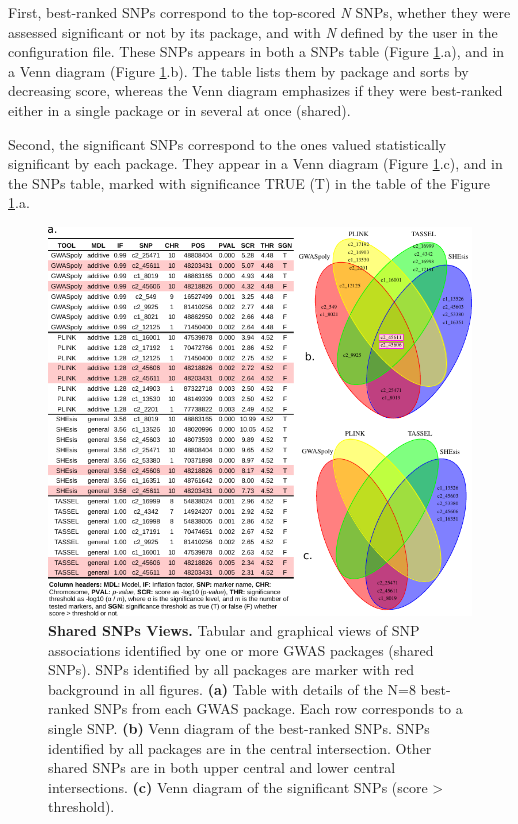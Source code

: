 \documentclass{article}
\begin{document}
First, best-ranked SNPs correspond to the top-scored \emph{N} SNPs, whether they were assessed significant or not by its package, and with\emph{ N} defined by the user in the configuration file. These SNPs appears in both a SNPs table (Figure \ref{fig:Table-Shared-SNPs}.a), and in a Venn diagram (Figure \ref{fig:Table-Shared-SNPs}.b). The table lists them by package and sorts by decreasing score, whereas the Venn diagram emphasizes if they were best-ranked either in a single package or in several at once (shared).

Second, the significant SNPs correspond to the ones valued statistically significant by each package. They appear in a Venn diagram (Figure \ref{fig:Table-Shared-SNPs}.c), and in the SNPs table, marked with significance TRUE (T) in the table of the Figure \ref{fig:Table-Shared-SNPs}.a.

\begin{figure}[H]
\begin{centering}
\includegraphics{images/paper-table-venn-best} 
\par\end{centering}
\caption{\textbf{Shared SNPs Views.} Tabular and graphical views of SNP associations identified by one or more GWAS packages (shared SNPs). SNPs identified by all packages are marker with red background in all figures. \textbf{(a)} Table with details of the N=8 best-ranked SNPs from each GWAS package. Each row corresponds to a single SNP. \textbf{(b)} Venn diagram of the best-ranked SNPs. SNPs identified by all packages are in the central intersection. Other shared SNPs are in both upper central and lower central intersections. \textbf{(c)} Venn diagram of the significant SNPs (score \textgreater{} threshold). \label{fig:Table-Shared-SNPs}}
\end{figure}
\end{document}
